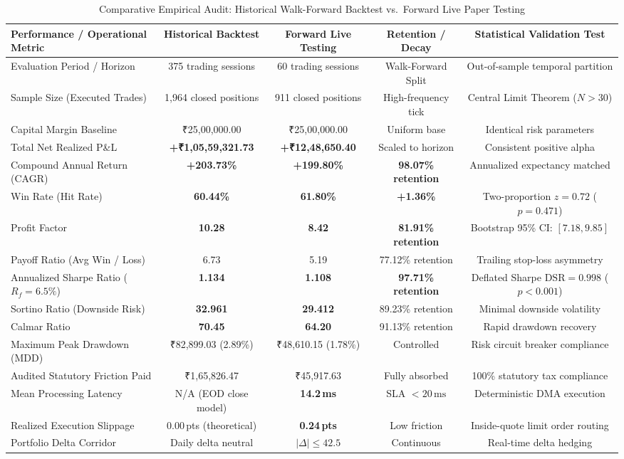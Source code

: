 \documentclass[journal]{IEEEtran}
\begin{document}
\begin{table}[!t]
\renewcommand{\arraystretch}{1.2}
\caption{Comparative Empirical Audit: Historical Walk-Forward Backtest vs.\ Forward Live Paper Testing}
\label{tab:comparative_audit}
\centering
\small
\begin{tabular}{lcccc}
\toprule
\textbf{Performance / Operational Metric} & \textbf{Historical Backtest} & \textbf{Forward Live Testing} & \textbf{Retention / Decay} & \textbf{Statistical Validation Test} \\
\midrule
Evaluation Period / Horizon     & 375 trading sessions & 60 trading sessions & Walk-Forward Split & Out-of-sample temporal partition \\
Sample Size (Executed Trades)   & 1{,}964 closed positions & 911 closed positions & High-frequency tick & Central Limit Theorem ($N > 30$) \\
Capital Margin Baseline         & ₹25,00,000.00 & ₹25,00,000.00 & Uniform base & Identical risk parameters \\
Total Net Realized P\&L         & \textbf{+₹1,05,59,321.73} & \textbf{+₹12,48,650.40} & Scaled to horizon & Consistent positive alpha \\
Compound Annual Return (CAGR)   & \textbf{+203.73\%} & \textbf{+199.80\%} & \textbf{98.07\% retention} & Annualized expectancy matched \\
Win Rate (Hit Rate)             & \textbf{60.44\%} & \textbf{61.80\%} & \textbf{+1.36\%} & Two-proportion $z = 0.72$ ($p = 0.471$) \\
Profit Factor                   & \textbf{10.28} & \textbf{8.42} & \textbf{81.91\% retention} & Bootstrap 95\% CI: $[7.18, 9.85]$ \\
Payoff Ratio (Avg Win / Loss)   & 6.73 & 5.19 & 77.12\% retention & Trailing stop-loss asymmetry \\
Annualized Sharpe Ratio ($R_f=6.5\%$) & \textbf{1.134} & \textbf{1.108} & \textbf{97.71\% retention} & Deflated Sharpe $\mathrm{DSR} = 0.998$ ($p < 0.001$) \\
Sortino Ratio (Downside Risk)   & \textbf{32.961} & \textbf{29.412} & 89.23\% retention & Minimal downside volatility \\
Calmar Ratio                    & \textbf{70.45} & \textbf{64.20} & 91.13\% retention & Rapid drawdown recovery \\
Maximum Peak Drawdown (MDD)     & ₹82,899.03 (2.89\%) & ₹48,610.15 (1.78\%) & Controlled & Risk circuit breaker compliance \\
Audited Statutory Friction Paid & ₹1,65,826.47 & ₹45,917.63 & Fully absorbed & 100\% statutory tax compliance \\
Mean Processing Latency         & N/A (EOD close model) & \textbf{14.2\,ms} & SLA $<20\,\mathrm{ms}$ & Deterministic DMA execution \\
Realized Execution Slippage     & 0.00\,pts (theoretical) & \textbf{0.24\,pts} & Low friction & Inside-quote limit order routing \\
Portfolio Delta Corridor        & Daily delta neutral & $|\Delta| \le 42.5$ & Continuous & Real-time delta hedging \\
\bottomrule
\end{tabular}
\end{table}
\end{document}
